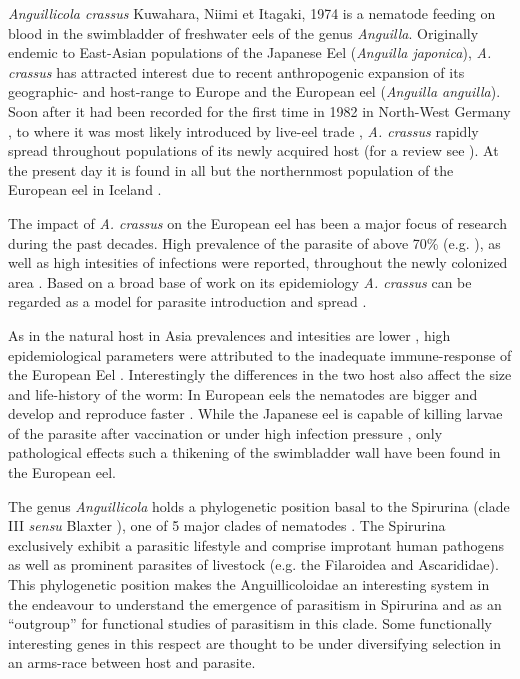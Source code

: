 \documentclass[10pt]{bmc_article}
\newenvironment{bmcformat}{\begin{raggedright}\baselineskip20pt\sloppy\setboolean{publ}{false}}{\end{raggedright}\baselineskip20pt\sloppy}
\begin{document}
\begin{bmcformat}
\textit{Anguillicola crassus} Kuwahara, Niimi et Itagaki, 1974
\cite{kuwahara_Niimi_Itagaki_1974} is a nematode feeding on blood in
the swimbladder of freshwater eels of the genus
\textit{Anguilla}. Originally endemic to East-Asian populations of the
Japanese Eel (\textit{Anguilla japonica}), \textit{A. crassus} has
attracted interest due to recent anthropogenic expansion of its
geographic- and host-range to Europe and the European eel
(\textit{Anguilla anguilla}). Soon after it had been recorded for the
first time in 1982 in North-West Germany \cite{fischer_teichwirt}, to
where it was most likely introduced by live-eel trade
\cite{koops_anguillicola-infestations_1989, koie_swimbladder_1991},
\textit{A. crassus} rapidly spread throughout populations of its newly
acquired host (for a review see \cite{kirk_impact_2003}). At the
present day it is found in all but the northernmost population of the
European eel in Iceland \cite{kristmundsson_parasite_2007}.

The impact of \textit{A. crassus} on the European eel has been a major
focus of research during the past decades. High prevalence of the
parasite of above 70\% (e.g. \cite{wrtz_distribution_1998}), as well
as high intesities of infections were reported, throughout the newly
colonized area \cite{lefebvre_anguillicolosis:_2004}.  Based on a
broad base of work on its epidemiology \textit{A. crassus} can be
regarded as a model for parasite introduction and spread
\cite{taraschewski_hosts_2007}.

As in the natural host in Asia prevalences and intesities are lower
\cite{mnderle_occurrence_2006}, high epidemiological parameters
were attributed to the inadequate immune-response of the European Eel
\cite{knopf_swimbladder_2006}. Interestingly the differences in the
two host also affect the size and life-history of the worm: In
European eels the nematodes are bigger and develop and reproduce
faster \cite{knopf_differences_2004}.  While the Japanese eel is
capable of killing larvae of the parasite after vaccination
\cite{knopf_vaccination_2008} or under high infection pressure
\cite{heitlinger_massive_2009}, only pathological effects such a
thikening of the swimbladder wall \cite{wrtz_histopathological_2000}
have been found in the European eel. 

The genus \textit{Anguillicola} holds a phylogenetic position basal to
the Spirurina (clade III \textit{sensu} Blaxter
\cite{blaxter_molecular_1998}), one of 5 major clades of nematodes
\cite{nadler_molecular_2007, wijov_evolutionary_2006}. The Spirurina
exclusively exhibit a parasitic lifestyle and comprise improtant human
pathogens as well as prominent parasites of livestock (e.g. the
Filaroidea and Ascarididae). This phylogenetic position makes the
Anguillicoloidae an interesting system in the endeavour to understand
the emergence of parasitism in Spirurina and as an ``outgroup'' for
functional studies of parasitism in this clade. Some functionally
interesting genes in this respect are thought to be under diversifying
selection in an arms-race between host and
parasite\cite{zang_serine_2001}.


\end{bmcformat}
\end{document}
